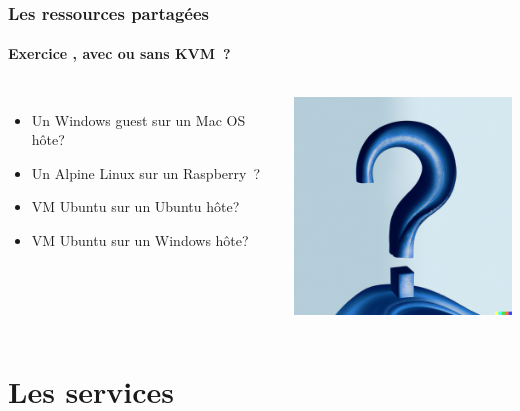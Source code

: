 \documentclass{beamer}
\begin{document}
    \begin{frame}
        \transdissolve
        \frametitle{Les ressources partagées}
        \framesubtitle{Exercice \execcounterdispinc{}, avec ou sans KVM~?}
        \begin{columns}
            \begin{itemize}
                \item Un Windows guest sur un Mac OS hôte?
                \item Un Alpine Linux sur un Raspberry\footnotemark~?
                \item VM Ubuntu sur un Ubuntu hôte?
                \item VM Ubuntu sur un Windows hôte?
            \end{itemize}
            \centering
            \includegraphics[width=6cm]{image/question-mark-on-a-blank-background}
        \end{columns}
    \end{frame}


    \section{Les services}\label{sec:les-services}
\end{document}
